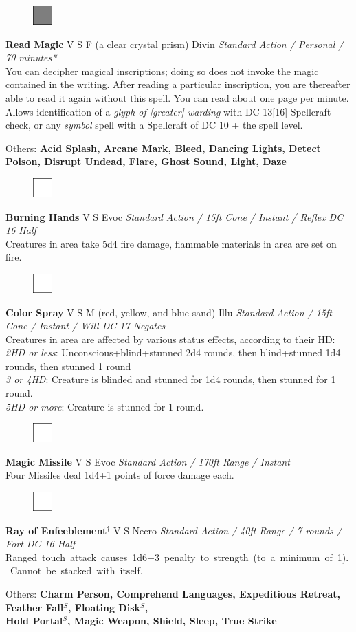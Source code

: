 \documentclass[letterpaper]{article}
\newcommand{\e}[1]{\emph{#1}}
\newcommand{\B}[1]{\textbf{#1}}
\newcommand{\s}[0]{$^S$}
\newcommand{\D}[0]{$^\dag$}
\newcommand{\spell}[7]{
\begin{figure}
\vspace{-13pt}
\ifstrequal{#2}{Full}{  \includegraphics[width=2em]{Checkbox-Full}}{
\ifstrequal{#2}{Scroll}{\includegraphics[width=2em]{Checkbox-S}}{
                        \includegraphics[width=2em]{Checkbox}}}
\ifstrequal{#7}{}{\vspace{-1em}}{\vspace{#7}}
\end{figure}
 \B{#1} #3 {
    \ifstrequal{#4}{Conj}{\color{Plum}Conj}{%
    \ifstrequal{#4}{Divin}{\color{YellowOrange}Divin}{%
    \ifstrequal{#4}{Ench}{\color{VioletRed}Ench}{%
    \ifstrequal{#4}{Trans}{\color{LimeGreen}Trans}{%
    \ifstrequal{#4}{Evoc}{\color{RedOrange}Evoc}{%
    \ifstrequal{#4}{Illu}{\color{ProcessBlue}Illu}{%
    \ifstrequal{#4}{Abjur}{\color{CadetBlue}Abjur}{%
    \ifstrequal{#4}{Necro}{\color{Red}Necro}{%
}}}}}}}}}
{\footnotesize \e{#5}} \\
#6
}
\begin{document}
\spell{Read Magic}{Full}{V S F (a clear crystal prism)}{Divin}{Standard Action / Personal / 70 minutes*}{
You can decipher magical inscriptions; doing so does not invoke the magic contained in the writing.  After reading a particular inscription, you are thereafter able to read it again without this spell.  You can read about one page per minute. Allows identification of a \e{glyph of [greater] warding} with DC 13[16] Spellcraft check, or any \e{symbol} spell with a Spellcraft of DC 10 + the spell level.}{1em}\\[-1em] %
\begin{adjustwidth}{3em}{0em}
Others: \B{Acid Splash, Arcane Mark, Bleed, Dancing Lights, Detect Poison, Disrupt Undead, Flare, Ghost Sound, Light, Daze}\\
\end{adjustwidth}

\spell{Burning Hands}{}{V S}{Evoc}{Standard Action / 15ft Cone / Instant / Reflex DC 16 Half}{%
Creatures in area take 5d4 fire damage, flammable materials in area are set on fire.}{}\\[-1em] %

\spell{Color Spray}{}{V S M (red, yellow, and blue sand)}{Illu}{Standard Action / 15ft Cone / Instant / Will DC 17 Negates}{%
Creatures in area are affected by various status effects, according to their HD:\\
\e{2HD or less}: Unconscious+blind+stunned 2d4 rounds, then blind+stunned 1d4 rounds, then stunned 1 round \\
\e{3 or 4HD}: Creature is blinded and stunned for 1d4 rounds, then stunned for 1 round.\\
\e{5HD or more}: Creature is stunned for 1 round.}{1em}

\spell{Magic Missile}{}{V S}{Evoc}{Standard Action / 170ft Range / Instant}{%
Four Missiles deal 1d4+1 points of force damage each.}{} \\[-1em] %

\spell{Ray of Enfeeblement\D}{}{V S}{Necro}{Standard Action / 40ft Range / 7 rounds / Fort DC 16 Half}{%
\mbox{Ranged touch attack causes 1d6+3 penalty to strength (to a minimum of 1).  Cannot be stacked with itself.}}{} \\[-1em] %

\begin{adjustwidth}{3em}{0em}
Others: \B{Charm Person, Comprehend Languages, Expeditious Retreat, Feather Fall\s , Floating Disk\s ,\\ Hold Portal\s , Magic Weapon, Shield, Sleep, True Strike} \\
\end{adjustwidth}
\end{document}
